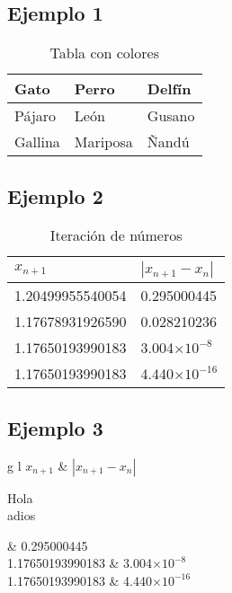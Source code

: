 \documentclass{article}
\begin{document}
\subsection{Ejemplo 1}
\begin{table}[h]
	\centering
	\begin{tabular}{|l|l|l|} \hline
		Gato & Perro & Delfín \\ \hline
		Pájaro & León & Gusano \\ \hline
		\cellcolor{green} Gallina & Mariposa & Ñandú \\ \hline
	\end{tabular}
	\caption{Tabla con colores}
\end{table}

\subsection{Ejemplo 2}
\begin{table}[h]
	\centering
	\begin{tabular}{ll} 
		\rowcolor{Salmon} $x_{n+1}$ & $|x_{n+1}-x_n|$\\ \hline
		1.20499955540054 & 0.295000445\\
		1.17678931926590 & 0.028210236\\
		1.17650193990183 & 3.004$\times10^{-8}$\\
		1.17650193990183 & 4.440$\times10^{-16}$\\ \hline
	\end{tabular}
	\caption{Iteración de números}
\end{table}

\subsection{Ejemplo 3}
\begin{table}[h]
	\centering
	\begin{tabular}{g l} 
		 $x_{n+1}$ & $|x_{n+1}-x_n|$\\ \hline
		\begin{flushleft} Hola\\adios \end{flushleft}%
      & 0.295000445\\
		1.17650193990183 & 3.004$\times10^{-8}$\\
		1.17650193990183 & 4.440$\times10^{-16}$\\ \hline
	\end{tabular}
	\caption{Iteración de números}
\end{table}
\end{document}
